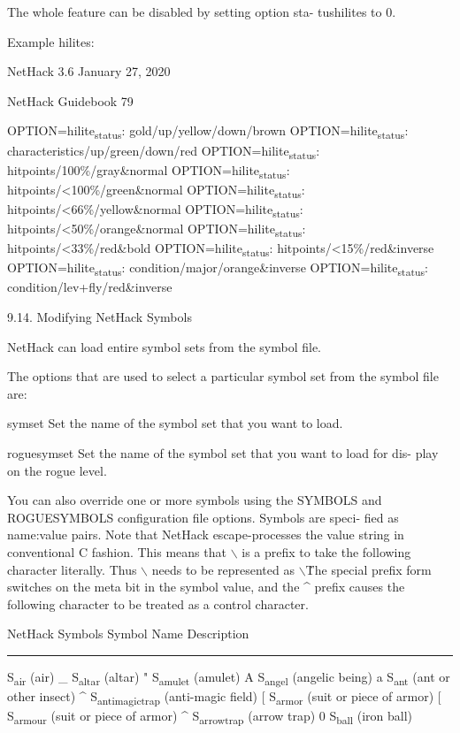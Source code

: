 \documentclass[11pt]{article}
\begin{document}
   The whole feature can be disabled by setting option sta-
tushilites to 0.

Example hilites:




NetHack 3.6                   January 27, 2020





NetHack Guidebook                       79



OPTION=hilite\textsubscript{status}: gold/up/yellow/down/brown
OPTION=hilite\textsubscript{status}: characteristics/up/green/down/red
OPTION=hilite\textsubscript{status}: hitpoints/100\%/gray\&normal
OPTION=hilite\textsubscript{status}: hitpoints/<100\%/green\&normal
OPTION=hilite\textsubscript{status}: hitpoints/<66\%/yellow\&normal
OPTION=hilite\textsubscript{status}: hitpoints/<50\%/orange\&normal
OPTION=hilite\textsubscript{status}: hitpoints/<33\%/red\&bold
OPTION=hilite\textsubscript{status}: hitpoints/<15\%/red\&inverse
OPTION=hilite\textsubscript{status}: condition/major/orange\&inverse
OPTION=hilite\textsubscript{status}: condition/lev+fly/red\&inverse

9.14. Modifying NetHack Symbols

NetHack can load entire symbol sets from the symbol file.

   The options that are used to select a particular symbol set
from the symbol file are:

symset
 Set the name of the symbol set that you want to load.

roguesymset
 Set the name of the symbol set that you want to load for dis-
 play on the rogue level.

   You can also override one or more symbols using the SYMBOLS
and ROGUESYMBOLS configuration file options. Symbols are speci-
fied as name:value pairs. Note that NetHack escape-processes the
value string in conventional C fashion. This means that $\backslash$ is a
prefix to take the following character literally. Thus $\backslash$ needs
to be represented as $\backslash$\. The special prefix form \m switches on
the meta bit in the symbol value, and the \^{} prefix causes the
following character to be treated as a control character.

NetHack Symbols
  Symbol Name      Description

\noindent\rule{\textwidth}{0.5pt}
  S\textsubscript{air}         (air)
\_ S\textsubscript{altar}        (altar)
" S\textsubscript{amulet}        (amulet)
A S\textsubscript{angel}        (angelic being)
a S\textsubscript{ant}         (ant or other insect)
\^{} S\textsubscript{anti}\textsubscript{magic}\textsubscript{trap}   (anti-magic field)
[ S\textsubscript{armor}        (suit or piece of armor)
[ S\textsubscript{armour}        (suit or piece of armor)
\^{} S\textsubscript{arrow}\textsubscript{trap}      (arrow trap)
0 S\textsubscript{ball}         (iron ball)
\end{document}
